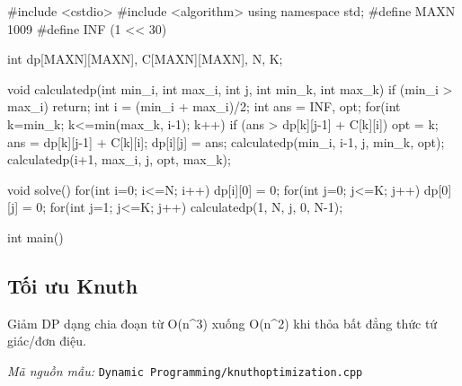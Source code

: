 \documentclass[11pt]{article}
\newcommand{\codepath}[1]{\par\noindent\textit{Mã nguồn mẫu:} \texttt{#1}\par}
\begin{document}
\begingroup\scriptsize
\begin{vncode}
#include <cstdio>
#include <algorithm>
using namespace std;
#define MAXN 1009
#define INF (1 << 30)

int dp[MAXN][MAXN], C[MAXN][MAXN], N, K;

void calculatedp(int min_i, int max_i, int j, int min_k, int max_k) {
	if (min_i > max_i) return;
	int i = (min_i + max_i)/2;
	int ans = INF, opt;
	for(int k=min_k; k<=min(max_k, i-1); k++) {
		if (ans > dp[k][j-1] + C[k][i]) {
			opt = k;
			ans = dp[k][j-1] + C[k][i];
		}
	}
	dp[i][j] = ans;
	calculatedp(min_i, i-1, j, min_k, opt);
	calculatedp(i+1, max_i, j, opt, max_k);
}

void solve() {
	for(int i=0; i<=N; i++) dp[i][0] = 0;
	for(int j=0; j<=K; j++) dp[0][j] = 0;
	for(int j=1; j<=K; j++) {
		calculatedp(1, N, j, 0, N-1);
	}
}

int main() {

}
\end{vncode}
\endgroup


\subsection{Tối ưu Knuth}

Giảm DP dạng chia đoạn từ O(n\textasciicircum{}3) xuống O(n\textasciicircum{}2) khi thỏa bất đẳng thức tứ giác/đơn điệu.

\codepath{Dynamic Programming/knuthoptimization.cpp}

\begingroup\scriptsize
{}
\endgroup
\end{document}
